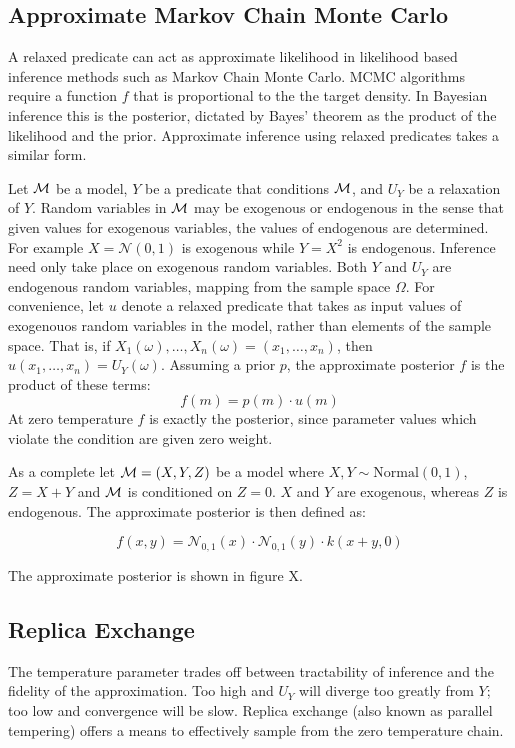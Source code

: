 \subsection{Approximate Markov Chain Monte Carlo}
A relaxed predicate can act as approximate likelihood in likelihood based inference methods such as Markov Chain Monte Carlo.
MCMC algorithms require a function $f$ that is proportional to the the target density.
In Bayesian inference this is the posterior, dictated by Bayes' theorem as the product of the likelihood and the prior.
Approximate inference using relaxed predicates takes a similar form.

Let ${\mathcal{M}}$ be a model, $Y$ be a predicate that conditions ${\mathcal{M}}$, and $U_Y$ be a relaxation of $Y$.
Random variables in ${\mathcal{M}}$ may be exogenous or endogenous in the sense that
given values for exogenous variables, the values of endogenous are determined.
For example $X = \mathcal{N}(0,1)$ is exogenous while $Y = X^2$ is endogenous.
Inference need only take place on exogenous random variables.
Both $Y$ and $U_Y$ are endogenous random variables, mapping from the sample space $\Omega$.
For convenience, let $u$ denote a relaxed predicate that takes as input values of exogenouos random variables in the model, rather than elements of the sample space.
That is, if $X_1(\omega), \dots, X_n(\omega) = (x_1, \dots, x_n)$, then $u(x_1, \dots, x_n) = U_Y(\omega)$.
Assuming a prior $p$, the approximate posterior $f$ is the product of these terms:
\begin{equation}
f(m) = p(m) \cdot u(m)
\end{equation}
At zero temperature $f$ is exactly the posterior, since parameter values which violate the condition are given zero weight.

As a complete let ${\mathcal{M}} = (X, Y, Z)$ be a model where $X, Y \sim \textrm{Normal}(0, 1)$, $Z = X + Y$ and ${\mathcal{M}}$ is conditioned on $Z = 0$.
$X$ and $Y$ are exogenous, whereas $Z$ is endogenous.
The approximate posterior is then defined as:

$$
f(x, y) = \mathcal{N}_{0,1}(x) \cdot \mathcal{N}_{0,1}(y) \cdot k(x + y, 0) 
$$

The approximate posterior is shown in figure X.

\subsection{Replica Exchange}

The temperature parameter trades off between tractability of inference and the fidelity of the approximation.
Too high and $U_Y$ will diverge too greatly from $Y$; too low and convergence will be slow.
Replica exchange (also known as parallel tempering) \citep{swendsen1986replica} offers a means to effectively sample from the zero temperature chain.

